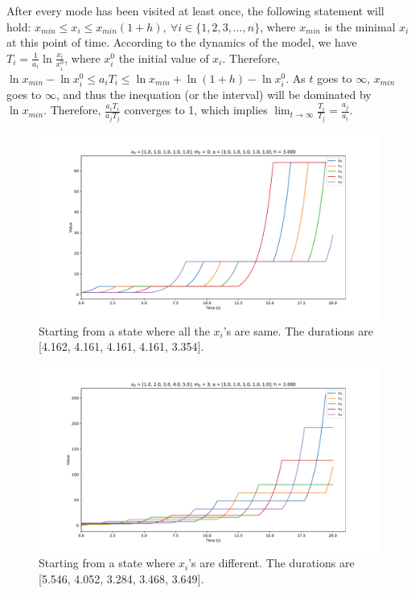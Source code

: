 \documentclass[11pt]{article}
\begin{document}
\begin{enumerate}[(a)]
After every mode has been visited at least once, the following statement will hold: $x_{min} \leq x_i \leq x_{min}(1+h),~\forall i \in \{1,2,3,\ldots,n\}$, where $x_{min}$ is the minimal $x_i$ at this point of time. According to the dynamics of the model, we have $T_i = \frac{1}{a_i} \ln \frac{x_i}{x_i^0}$, where $x_i^0$ the initial value of $x_i$. Therefore, $\ln x_{min} - \ln{x_i^0} \leq a_i T_i \leq \ln x_{min} + \ln(1+h) - \ln{x_i^0}$. As $t$ goes to $\infty$, $x_{min}$ goes to $\infty$, and thus the inequation (or the interval) will be dominated by $\ln x_{min}$. Therefore, $\frac{a_i T_i}{a_j T_j}$ converges to 1, which implies $\lim_{t \to \infty} \frac{T_i}{T_j} = \frac{a_j}{a_i}$.
\end{enumerate}

\begin{figure}[h]
\centering
\includegraphics[width=12cm]{same_initial}
\caption{Starting from a state where all the $x_i$'s are same. The durations are [4.162, 4.161, 4.161, 4.161, 3.354].}
\label{fig:same}
\end{figure}

\begin{figure}[h]
\centering
\includegraphics[width=12cm]{different_initial}
\caption{Starting from a state where $x_i$'s are different. The durations are [5.546, 4.052, 3.284, 3.468, 3.649].}
\label{fig:different}
\end{figure}
\end{document}
